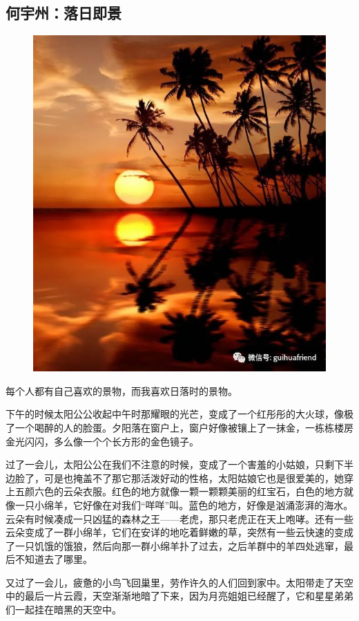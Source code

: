 \vspace{10pt}

{\centering\subsection*{何宇州：落日即景}}


\renewcommand{\leftmark}{何宇州：落日即景}

\begin{figure}[htbp]

\centering

\includegraphics[width = .5\textwidth]{./ch/35.jpg}

\end{figure}



每个人都有自己喜欢的景物，而我喜欢日落时的景物。



下午的时候太阳公公收起中午时那耀眼的光芒，变成了一个红彤彤的大火球，像极了一个喝醉的人的脸蛋。夕阳落在窗户上，窗户好像被镶上了一抹金，一栋栋楼房金光闪闪，多么像一个个长方形的金色镜子。

过了一会儿，太阳公公在我们不注意的时候，变成了一个害羞的小姑娘，只剩下半边脸了，可是也掩盖不了那它那活泼好动的性格，太阳姑娘它也是很爱美的，她穿上五颜六色的云朵衣服。红色的地方就像一颗一颗颗美丽的红宝石，白色的地方就像一只小绵羊，它好像在对我们“咩咩”叫。蓝色的地方，好像是汹涌澎湃的海水。云朵有时候凑成一只凶猛的森林之王——老虎，那只老虎正在天上咆哮。还有一些云朵变成了一群小绵羊，它们在安详的地吃着鲜嫩的草，突然有一些云快速的变成了一只饥饿的饿狼，然后向那一群小绵羊扑了过去，之后羊群中的羊四处逃窜，最后不知道去了哪里。

又过了一会儿，疲惫的小鸟飞回巢里，劳作许久的人们回到家中。太阳带走了天空中的最后一片云霞，天空渐渐地暗了下来，因为月亮姐姐已经醒了，它和星星弟弟们一起挂在暗黑的天空中。





